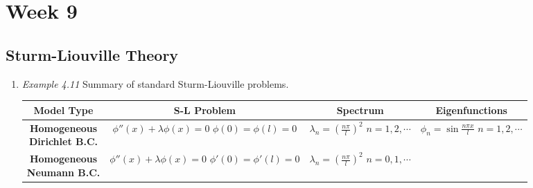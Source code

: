 \chapter{Week 9}
\setcounter{weekpage}{1}
\thispagestyle{plainweek}

\section{Sturm-Liouville Theory}


\begin{enumerate}

\item \textit{Example 4.11} Summary of standard Sturm-Liouville problems.

\begin{center}\small
\begin{tabular}{|c|c|c|c|}
    \hline
    \parbox[c][30pt]{90pt}{\centering \textbf{Model Type}} & 
    \parbox[c][30pt]{90pt}{\centering \textbf{S-L Problem}} & \parbox[t]{90pt}{\centering \textbf{Spectrum}} & 
    \parbox[c][30pt]{90pt}{\centering \textbf{Eigenfunctions}} \\
    \hline
    \parbox[c][30pt]{90pt}{\centering \textbf{Homogeneous \\ \vspace{10pt} Dirichlet B.C.}} & 
    \parbox[c][60pt]{90pt}{\centering $\phi''(x) + \lambda \phi(x)=0$ \\ \vspace{10pt} $\phi(0)=\phi(l)=0$}
    & 
    \parbox[c][60pt]{90pt}{\centering $\displaystyle \lambda_{n}=\left( \frac{n\pi}{l} \right)^{2}$ \\ \vspace{10pt} $n=1, 2, \cdots$} & 
    \parbox[c][60pt]{90pt}{\centering $\displaystyle \phi_{n} = \sin\frac{n\pi x}{l}$ \\ \vspace{10pt} $n=1, 2, \cdots$} \\
    \hline 
    \parbox[c][30pt]{90pt}{\centering \textbf{Homogeneous \\ \vspace{10pt} Neumann B.C.}} & 
    \parbox[c][60pt]{90pt}{\centering $\phi''(x) + \lambda \phi(x)=0$ \\ \vspace{10pt} $\phi'(0)=\phi'(l)=0$}
    & 
    \parbox[c][60pt]{90pt}{\centering $\displaystyle \lambda_{n}=\left( \frac{n\pi}{l} \right)^{2}$ \\ \vspace{10pt} $n=0, 1, \cdots$} & 

\end{tabular}
\end{center}
\end{enumerate}
